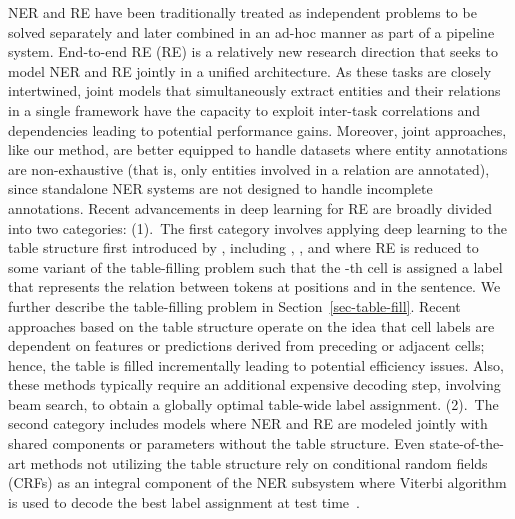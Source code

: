 \documentclass{clv3}
\newcommand{\ere}{RE}
\begin{document}
NER and RE have been traditionally treated as independent problems to be solved separately and later combined in an ad-hoc manner as part of a pipeline system. End-to-end RE (\ere{}) is a relatively new research direction that seeks to model NER and RE jointly in a unified architecture. As these tasks are closely intertwined, joint models that simultaneously extract entities and their relations in a single framework have the capacity to exploit inter-task correlations and dependencies leading to potential performance gains. Moreover, joint approaches, like our method, are better equipped to handle datasets where entity annotations are non-exhaustive (that is, only entities involved in a relation are annotated), since standalone NER systems are not designed to handle incomplete annotations.
Recent advancements in deep learning for \ere{} are broadly divided into two categories:
(1).~The first category involves applying deep learning to the table structure first introduced by , including , , and  where \ere{} is reduced to some variant of the table-filling problem such that the -th cell is assigned a label that represents the relation between tokens at positions  and  in the sentence. We further describe the table-filling problem in Section~\ref{sec-table-fill}. 
Recent approaches based on the table structure operate on the idea that cell labels are dependent on features or predictions derived from preceding or adjacent cells; hence, the table is filled incrementally  leading to potential efficiency issues. Also, these methods typically require an additional expensive decoding step, involving beam search, to obtain a globally optimal table-wide label assignment. 
(2).~The second category includes models where NER and RE are modeled jointly with shared components or parameters without the table structure. Even state-of-the-art methods not utilizing the table structure rely on conditional random fields (CRFs) as an integral component of the NER subsystem where   Viterbi algorithm is used to decode the best  label assignment at test time~\cite{bekoulis2018join,bekoulis2018adversarial}. 
\end{document}
